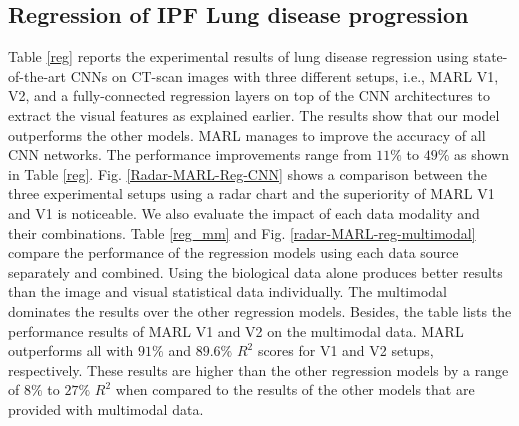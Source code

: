 \documentclass[conference]{IEEEtran}
\begin{document}
\subsection{Regression of IPF Lung disease progression}
Table \ref{reg} reports the experimental results of lung disease regression using state-of-the-art CNNs on CT-scan images with three different setups, i.e., MARL V1, V2, and a fully-connected regression layers on top of the CNN architectures to extract the visual features as explained earlier.  
The results show that our model outperforms the other models. MARL manages to improve the accuracy of all CNN networks. The performance improvements range from $11\%$ to $49\%$ as shown in Table \ref{reg}. Fig. \ref{Radar-MARL-Reg-CNN} shows a comparison between the three experimental setups using a radar chart and the superiority of MARL V1 and V1 is noticeable. We also evaluate the impact of each data modality and their combinations. Table \ref{reg_mm} and Fig. \ref{radar-MARL-reg-multimodal} compare the performance of the regression models using each data source separately and combined. Using the biological data alone produces better results than the image and visual statistical data individually. The multimodal dominates the results over the other regression models. Besides, the table lists the performance results of MARL V1 and V2 on the multimodal data. MARL outperforms all with $91\%$ and $89.6\%$ $R^2$ scores for V1 and V2 setups, respectively. These results are higher than the other regression models by a range of $8\%$ to $27\%$ $R^2$ when compared to the results of the other models that are provided with multimodal data.
\end{document}

